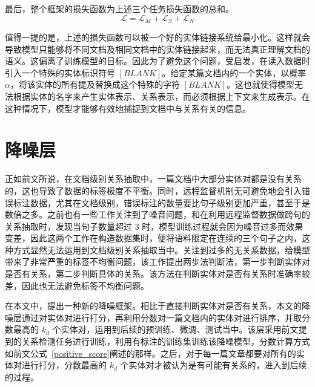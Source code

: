\hspace*{\fill}

最后，整个框架的损失函数为上述三个任务损失函数的总和。
\begin{equation}
	\mathcal{L} = \mathcal{L}_M + \mathcal{L}_S + \mathcal{L}_N
\end{equation}

值得一提的是，上述的损失函数可以被一个好的实体链接系统给最小化。这样就会导致模型只能够将不同文档及相同文档中的实体链接起来，而无法真正理解文档的语义。这偏离了训练模型的目标。因此为了避免这个问题，受\citet{soares2019matching}启发，在读入数据时引入一个特殊的实体标识符号 $[BLANK]$。给定某篇文档内的一个实体，以概率 $\alpha$，将该实体的所有提及替换成这个特殊的字符 $[BLANK]$。这也就使得模型无法根据实体的名字来产生实体表示、关系表示，而必须根据上下文来生成表示。在这种情况下，模型才能够有效地捕捉到文档中与关系有关的信息。


\section{降噪层}
正如前文所说，在文档级别关系抽取中，一篇文档中大部分实体对都是没有关系的，这也导致了数据的标签极度不平衡。同时，远程监督机制无可避免地会引入错误标注数据，尤其在文档级别，错误标注的数量要比句子级别更加严重，甚至于是数倍之多。之前也有一些工作关注到了噪音问题，\citet{peng2017cross}和\citet{quirk2017distant}在利用远程监督数据做跨句的关系抽取时，发现当句子数量超过 $3$ 时，模型训练过程就会因为噪音过多而效果变差，因此这两个工作在构造数据集时，便将语料限定在连续的三个句子之内，这种方式显然无法运用到文档级别关系抽取当中。\citet{wang2019fine}关注到过多的无关系数据，给模型带来了非常严重的标签不均衡问题，该工作提出两步法判断法，第一步判断实体对是否有关系，第二步判断具体的关系。该方法在判断实体对是否有关系时准确率较差，因此也无法避免标签不均衡问题。

在本文中，提出一种新的降噪框架。相比于直接判断实体对是否有关系，本文的降噪层通过对实体对进行打分，再利用分数对一篇文档内的实体对进行排序，并取分数最高的 $k_d$ 个实体对，运用到后续的预训练、微调、测试当中。该层采用前文提到的关系检测任务进行训练，利用有标注的训练集训练该降噪模型，分数计算方式如前文公式~\ref{positive_score}阐述的那样。之后，对于每一篇文章都要对所有的实体对进行打分，分数最高的 $k_d$ 个实体对才被认为是有可能有关系的，进入到后续的过程。



